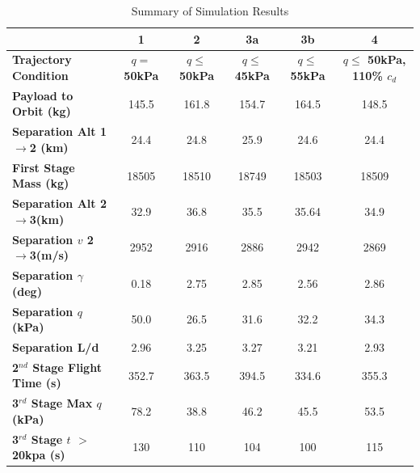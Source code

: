 \documentclass[]{aiaa-tc}
\newcommand{\FirstStageAltConstq}{24.4}
\newcommand{\FirstStageAltFifty}{24.8}
\newcommand{\FirstStageAltFortyFive}{25.9}
\newcommand{\FirstStageAltFiftyFive}{24.6}
\newcommand{\FirstStageAltHighDrag}{24.4}
\newcommand{\FirstStagemConstq}{18505}
\newcommand{\FirstStagemFortyFive}{18749}
\newcommand{\FirstStagemFifty}{18510}
\newcommand{\FirstStagemFiftyFive}{18503}
\newcommand{\FirstStagemHighDrag}{18509}
\newcommand{\PayloadToOrbitConstq}{145.5}
\newcommand{\PayloadToOrbitFiftykPa}{161.8}
\newcommand{\PayloadToOrbitFortyFivekPa}{154.7}
\newcommand{\PayloadToOrbitFiftyFivekPa}{164.5}
\newcommand{\PayloadToOrbitHighDrag}{148.5}
\newcommand{\SeparationAltConstq}{32.9}
\newcommand{\SeparationAltFiftykPa}{36.8}
\newcommand{\SeparationAltFortyFivekPa}{35.5}
\newcommand{\SeparationAltFiftyFivekPa}{35.64}
\newcommand{\SeparationAltHighDrag}{34.9}
\newcommand{\SeparationvConstq}{2952}
\newcommand{\SeparationvFiftykPa}{2916}
\newcommand{\SeparationvFortyFivekPa}{2886}
\newcommand{\SeparationvFiftyFivekPa}{2942}
\newcommand{\SeparationvHighDrag}{2869}
\newcommand{\SeparationAngleConstq}{0.18}
\newcommand{\SeparationAngleFiftykPa}{2.75}
\newcommand{\SeparationAngleFortyFivekPa}{2.85}
\newcommand{\SeparationAngleFiftyFivekPa}{2.56}
\newcommand{\SeparationAngleHighDrag}{2.86}
\newcommand{\SeparationqConstq}{50.0}
\newcommand{\SeparationqFiftykPa}{26.5}
\newcommand{\SeparationqFortyFivekPa}{31.6}
\newcommand{\SeparationqFiftyFivekPa}{32.2}
\newcommand{\SeparationqHighDrag}{34.3}
\newcommand{\SeparationLDConstq}{2.96}
\newcommand{\SeparationLDFiftykPa}{3.25}
\newcommand{\SeparationLDFortyFivekPa}{3.27}
\newcommand{\SeparationLDFiftyFivekPa}{3.21}
\newcommand{\SeparationLDHighDrag}{2.93}
\newcommand{\FlightTimeConstq}{352.7}
\newcommand{\FlightTimeFiftykPa}{363.5}
\newcommand{\FlightTimeFortyFivekPa}{394.5}
\newcommand{\FlightTimeFiftyFivekPa}{334.6}
\newcommand{\FlightTimeHighDrag}{355.3}
\newcommand{\MaxqConstq}{78.2}
\newcommand{\MaxqFiftykPa}{38.8}
\newcommand{\MaxqFortyFivekPa}{46.2}
\newcommand{\MaxqFiftyFivekPa}{45.5}
\newcommand{\MaxqHighDrag}{53.5}
\newcommand{\toverConstq}{130}
\newcommand{\toverFiftykPa}{110}
\newcommand{\toverFortyFivekPa}{104}
\newcommand{\toverFiftyFivekPa}{100}
\newcommand{\toverHighDrag}{115}
\begin{document}
\begin{table}[htb]
	\centering
	\caption{Summary of Simulation Results}
	\small
	\begin{tabular}{l c c c c c}
 & \textbf{1} & \textbf{2} & \textbf{3a} & \textbf{3b} & \textbf{4}  \\ 
 
		\hline \textbf{Trajectory Condition} & \textbf{$q = $ 50kPa} & \textbf{$q \leq $ 50kPa} & \textbf{ $q \leq $ 45kPa} & \textbf{$q \leq $ 55kPa} & \textbf{$q \leq $ 50kPa, 110\% $c_d$} \\ 
		\hline \textbf{Payload to Orbit (kg)}  & \PayloadToOrbitConstq & \PayloadToOrbitFiftykPa & \PayloadToOrbitFortyFivekPa & \PayloadToOrbitFiftyFivekPa & \PayloadToOrbitHighDrag \\ 
		\textbf{Separation Alt 1$\rightarrow$2 (km)}  & \FirstStageAltConstq & \FirstStageAltFifty & \FirstStageAltFortyFive &  \FirstStageAltFiftyFive &\FirstStageAltHighDrag \\ 
		\textbf{First Stage Mass (kg)} & \FirstStagemConstq & \FirstStagemFifty &  \FirstStagemFortyFive& \FirstStagemFiftyFive  & \FirstStagemHighDrag\\ 
		 \textbf{Separation Alt 2$\rightarrow$3(km)}  & \SeparationAltConstq & \SeparationAltFiftykPa & \SeparationAltFortyFivekPa & \SeparationAltFiftyFivekPa & \SeparationAltHighDrag\\ 
		 \textbf{Separation $v$ 2$\rightarrow$3(m/s)} & \SeparationvConstq  & \SeparationvFiftykPa & \SeparationvFortyFivekPa &  \SeparationvFiftyFivekPa & \SeparationvHighDrag\\ 
		 \textbf{Separation $\gamma$ (deg)} & \SeparationAngleConstq& \SeparationAngleFiftykPa &\SeparationAngleFortyFivekPa& \SeparationAngleFiftyFivekPa&\SeparationAngleHighDrag \\ 
		 \textbf{Separation $q$ (kPa)} & \SeparationqConstq  &\SeparationqFiftykPa&\SeparationqFortyFivekPa &\SeparationqFiftyFivekPa& \SeparationqHighDrag \\ 
		 \textbf{Separation L/d} & \SeparationLDConstq&\SeparationLDFiftykPa & \SeparationLDFortyFivekPa & \SeparationLDFiftyFivekPa &\SeparationLDHighDrag\\
		 \textbf{2$^{nd}$ Stage Flight Time (s)} & \FlightTimeConstq & \FlightTimeFiftykPa & \FlightTimeFortyFivekPa & \FlightTimeFiftyFivekPa & \FlightTimeHighDrag\\ 
		 \textbf{3$^{rd}$ Stage Max $q$ (kPa)} &\MaxqConstq  &\MaxqFiftykPa & \MaxqFortyFivekPa &\MaxqFiftyFivekPa & \MaxqHighDrag\\ 
		 \textbf{3$^{rd}$ Stage $t$ $>$ 20kpa (s)} &\toverConstq &\toverFiftykPa &\toverFortyFivekPa &\toverFiftyFivekPa & \toverHighDrag\\ 
		 
		 
		\hline 
	\end{tabular} 


	\label{table:Summary}
\end{table}
\end{document}
